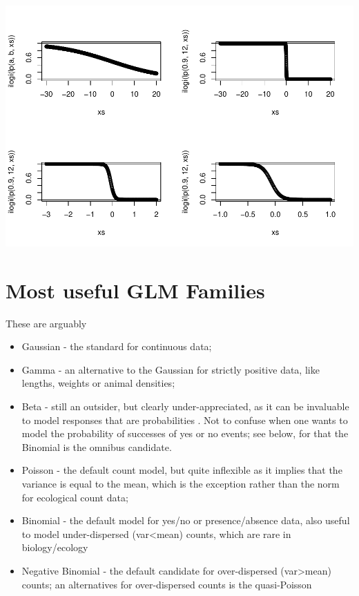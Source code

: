 \documentclass[
]{book}
\providecommand{\tightlist}{%
  \setlength{\itemsep}{0pt}\setlength{\parskip}{0pt}}
\begin{document}
\includegraphics{ECOMODbook_files/figure-latex/links2-1.pdf}

\hypertarget{most-useful-glm-families}{%
\section{Most useful GLM Families}\label{most-useful-glm-families}}

These are arguably

\begin{itemize}
\tightlist
\item
  Gaussian - the standard for continuous data;
\item
  Gamma - an alternative to the Gaussian for strictly positive data, like lengths, weights or animal densities;
\item
  Beta - still an outsider, but clearly under-appreciated, as it can be invaluable to model responses that are probabilities \citep{Douma2019}. Not to confuse when one wants to model the probability of successes of yes or no events; see below, for that the Binomial is the omnibus candidate.
\item
  Poisson - the default count model, but quite inflexible as it implies that the variance is equal to the mean, which is the exception rather than the norm for ecological count data;
\item
  Binomial - the default model for yes/no or presence/absence data, also useful to model under-dispersed (var\textless mean) counts, which are rare in biology/ecology
\item
  Negative Binomial - the default candidate for over-dispersed (var\textgreater mean) counts; an alternatives for over-dispersed counts is the quasi-Poisson \citep{Hoef2007}
\end{itemize}
\end{document}
